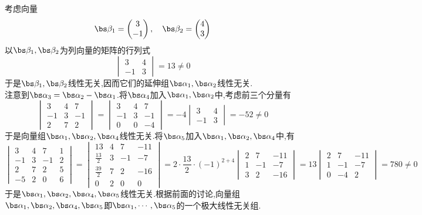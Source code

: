 \documentclass{ctexart}
\begin{document}
\begin{solution}
    考虑向量
    \[\bs\beta_1=\begin{pmatrix}
        3\\-1
    \end{pmatrix},\quad\bs\beta_2=\begin{pmatrix}
        4\\3
    \end{pmatrix}\]
    以$\bs\beta_1,\bs\beta_2$为列向量的矩阵的行列式
    \[\begin{vmatrix}
        3&4\\
        -1&3
    \end{vmatrix}=13\neq0\]
    于是$\bs\beta_1,\bs\beta_2$线性无关,因而它们的延伸组$\bs\alpha_1,\bs\alpha_2$线性无关.\\
    \indent 注意到$\bs\alpha_3=\bs\alpha_2-\bs\alpha_1$.将$\bs\alpha_4$加入$\bs\alpha_1,\bs\alpha_2$中,考虑前三个分量有
    \[\begin{vmatrix}
        3&4&7\\
        -1&3&-1\\
        2&7&2
    \end{vmatrix}=\begin{vmatrix}
        3&4&7\\
        -1&3&-1\\
        0&0&-4
    \end{vmatrix}=-4\begin{vmatrix}
        3&4\\-1&3
    \end{vmatrix}=-52\neq0\]
    于是向量组$\bs\alpha_1,\bs\alpha_2,\bs\alpha_4$线性无关.将$\bs\alpha_5$加入$\bs\alpha_1,\bs\alpha_2,\bs\alpha_4$中,有
    \[\begin{vmatrix}
        3&4&7&1\\
        -1&3&-1&2\\
        2&7&2&5\\
        -5&2&0&6
    \end{vmatrix}=\begin{vmatrix}
        13&4&7&-11\\
        \frac{13}{2}&3&-1&-7\\
        \frac{39}{2}&7&2&-16\\
        0&2&0&0
    \end{vmatrix}=2\cdot\dfrac{13}{2}\cdot(-1)^{2+4}\begin{vmatrix}
        2&7&-11\\
        1&-1&-7\\
        3&2&-16
    \end{vmatrix}=13\begin{vmatrix}
        2&7&-11\\
        1&-1&-7\\
        0&-4&2
    \end{vmatrix}=780\neq0\]
    于是$\bs\alpha_1,\bs\alpha_2,\bs\alpha_4,\bs\alpha_5$线性无关.根据前面的讨论,向量组$\bs\alpha_1,\bs\alpha_2,\bs\alpha_4,\bs\alpha_5$即$\bs\alpha_1,\cdots,\bs\alpha_5$的一个极大线性无关组.
\end{solution}
\end{document}
